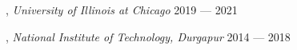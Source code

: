 , \textit{University of Illinois at Chicago}	\hfill 2019 --- 2021

, \textit{National Institute of Technology, Durgapur} \hfill 2014 --- 2018

